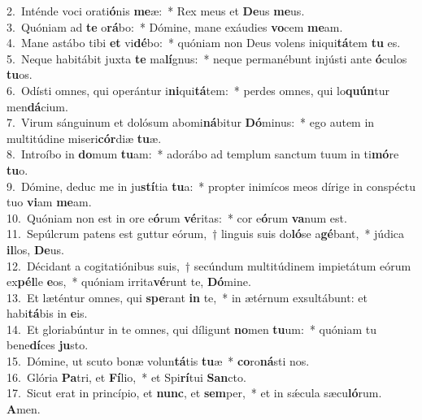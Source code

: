{2.~}Inténde voci orati\textbf{ó}nis \textbf{me}æ:~* Rex meus et \textbf{De}us \textbf{me}us.\\
{3.~}Quóniam ad \textbf{te} o\textbf{rá}bo:~* Dómine, mane exáudies \textbf{vo}cem \textbf{me}am.\\
{4.~}Mane astábo tibi \textbf{et} vi\textbf{dé}bo:~* quóniam non Deus volens iniqui\textbf{tá}tem \textbf{tu} es.\\
{5.~}Neque habitábit juxta \textbf{te} ma\textbf{lí}gnus:~* neque permanébunt injústi ante \textbf{ó}culos \textbf{tu}os.\\
{6.~}Odísti omnes, qui operántur i\textbf{ni}qui\textbf{tá}tem:~* perdes omnes, qui lo\textbf{quún}tur men\textbf{dá}cium.\\
{7.~}Virum sánguinum et dolósum abomi\textbf{ná}bitur \textbf{Dó}minus:~* ego autem in multitúdine miseri\textbf{cór}diæ \textbf{tu}æ.\\
{8.~}Introíbo in \textbf{do}mum \textbf{tu}am:~* adorábo ad templum sanctum tuum in ti\textbf{mó}re \textbf{tu}o.\\
{9.~}Dómine, deduc me in ju\textbf{stí}tia \textbf{tu}a:~* propter inimícos meos dírige in conspéctu tuo \textbf{vi}am \textbf{me}am.\\
{10.~}Quóniam non est in ore e\textbf{ó}rum \textbf{vé}ritas:~* cor e\textbf{ó}rum \textbf{va}num est.\\
{11.~}Sepúlcrum patens est guttur eórum,~† linguis suis do\textbf{ló}se a\textbf{gé}bant,~* júdica \textbf{il}los, \textbf{De}us.\\
{12.~}Décidant a cogitatiónibus suis,~† secúndum multitúdinem impietátum eórum ex\textbf{pél}le \textbf{e}os,~* quóniam irrita\textbf{vé}runt te, \textbf{Dó}mine.\\
{13.~}Et læténtur omnes, qui \textbf{spe}rant \textbf{in} te,~* in ætérnum exsultábunt: et habi\textbf{tá}bis in \textbf{e}is.\\
{14.~}Et gloriabúntur in te omnes, qui díligunt \textbf{no}men \textbf{tu}um:~* quóniam tu bene\textbf{dí}ces \textbf{ju}sto.\\
{15.~}Dómine, ut scuto bonæ volun\textbf{tá}tis \textbf{tu}æ~* \textbf{co}ro\textbf{ná}sti nos.\\
{16.~}Glória \textbf{Pa}tri, et \textbf{Fí}lio,~* et Spi\textbf{rí}tui \textbf{San}cto.\\
{17.~}Sicut erat in princípio, et \textbf{nunc}, et \textbf{sem}per,~* et in sǽcula sæcu\textbf{ló}rum. \textbf{A}men.\\
